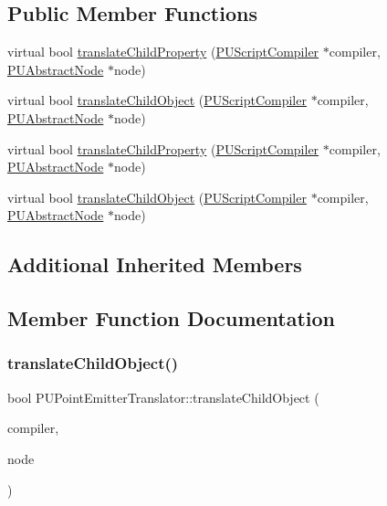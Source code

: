 \subsection*{Public Member Functions}
\begin{DoxyCompactItemize}
\item 
virtual bool \hyperlink{classPUPointEmitterTranslator_a5c08eb85b24737288c9dddaaab08c1dd}{translate\+Child\+Property} (\hyperlink{classPUScriptCompiler}{P\+U\+Script\+Compiler} $\ast$compiler, \hyperlink{classPUAbstractNode}{P\+U\+Abstract\+Node} $\ast$node)
\item 
virtual bool \hyperlink{classPUPointEmitterTranslator_a364d58c23660fa1fe4247b45c571c368}{translate\+Child\+Object} (\hyperlink{classPUScriptCompiler}{P\+U\+Script\+Compiler} $\ast$compiler, \hyperlink{classPUAbstractNode}{P\+U\+Abstract\+Node} $\ast$node)
\item 
virtual bool \hyperlink{classPUPointEmitterTranslator_a2d4f2b5db5a8b3f54af436ff2f284a2b}{translate\+Child\+Property} (\hyperlink{classPUScriptCompiler}{P\+U\+Script\+Compiler} $\ast$compiler, \hyperlink{classPUAbstractNode}{P\+U\+Abstract\+Node} $\ast$node)
\item 
virtual bool \hyperlink{classPUPointEmitterTranslator_a3a2eb9f379dc1890ccfcc3930f46af92}{translate\+Child\+Object} (\hyperlink{classPUScriptCompiler}{P\+U\+Script\+Compiler} $\ast$compiler, \hyperlink{classPUAbstractNode}{P\+U\+Abstract\+Node} $\ast$node)
\end{DoxyCompactItemize}
\subsection*{Additional Inherited Members}


\subsection{Member Function Documentation}
\mbox{\label{classPUPointEmitterTranslator_a364d58c23660fa1fe4247b45c571c368}} 
\subsubsection{\texorpdfstring{translate\+Child\+Object()}{translateChildObject()}\hspace{0.1cm}{\footnotesize\ttfamily [1/2]}}
{\footnotesize\ttfamily bool P\+U\+Point\+Emitter\+Translator\+::translate\+Child\+Object (\begin{DoxyParamCaption}\item[{\hyperlink{classPUScriptCompiler}{P\+U\+Script\+Compiler} $\ast$}]{compiler,  }\item[{\hyperlink{classPUAbstractNode}{P\+U\+Abstract\+Node} $\ast$}]{node }\end{DoxyParamCaption})\hspace{0.3cm}{\ttfamily [virtual]}}

